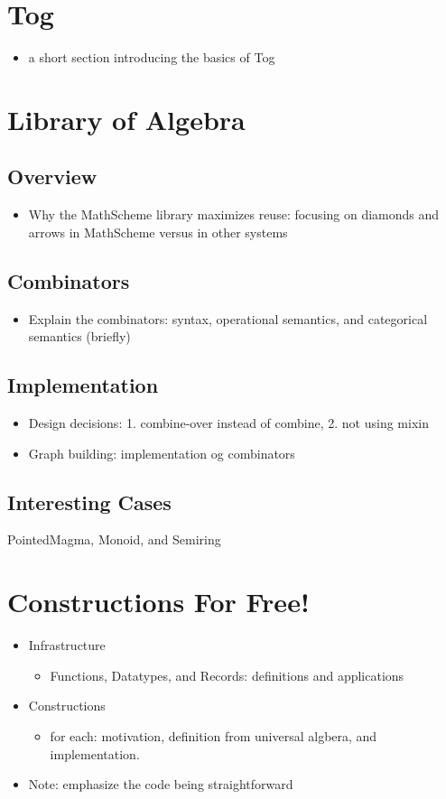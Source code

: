 \documentclass[]{article}
\begin{document}
\section{Tog}
\begin{itemize}
    \item a short section introducing the basics of Tog 
\end{itemize}

\section{Library of Algebra}
\subsection{Overview}
    \begin{itemize}
        \item Why the MathScheme library maximizes reuse: focusing on diamonds and arrows in MathScheme versus in other systems 
    \end{itemize}
\subsection{Combinators}
    \begin{itemize}
        \item Explain the combinators: syntax, operational semantics, and categorical semantics (briefly)
    \end{itemize}
\subsection{Implementation}
    \begin{itemize}
        \item Design decisions: 1. combine-over instead of combine, 2. not using mixin 
        \item Graph building: implementation og combinators 
    \end{itemize}
\subsection{Interesting Cases}
PointedMagma, Monoid, and Semiring 

\section{Constructions For Free!}    
\begin{itemize}
    \item Infrastructure
    \begin{itemize}
        \item Functions, Datatypes, and Records: definitions and applications 
    \end{itemize}
    \item Constructions 
    \begin{itemize}
        \item for each: motivation, definition from universal algbera, and implementation. 
    \end{itemize}
    \item Note: emphasize the code being straightforward 
\end{itemize}
\end{document}
